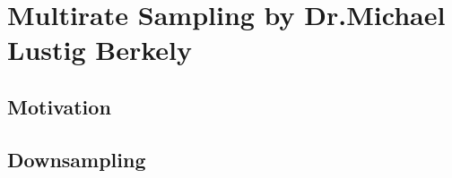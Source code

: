 \documentclass[12pt,a4paper]{book}
\begin{document}

\chapter{Multirate Sampling by Dr.Michael Lustig Berkely}


\section{Motivation}



\section{Downsampling}
\end{document}
